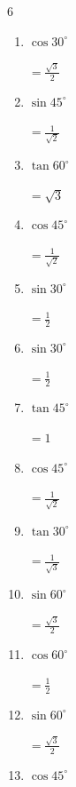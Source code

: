 \begin{multicols}{6}
\begin{enumerate}
        $\displaystyle =\frac{1}{\sqrt{2}}$

  \item $\displaystyle \cos{30^\circ}$

        $\displaystyle =\frac{\sqrt{3}}{2}$

  \item $\displaystyle \sin{45^\circ}$

        $\displaystyle =\frac{1}{\sqrt{2}}$

  \item $\displaystyle \tan{60^\circ}$

        $\displaystyle =\sqrt{3}$

  \item $\displaystyle \cos{45^\circ}$

        $\displaystyle =\frac{1}{\sqrt{2}}$

  \item $\displaystyle \sin{30^\circ}$

        $\displaystyle =\frac{1}{2}$

  \item $\displaystyle \sin{30^\circ}$

        $\displaystyle =\frac{1}{2}$

  \item $\displaystyle \tan{45^\circ}$

        $\displaystyle =1$

  \item $\displaystyle \cos{45^\circ}$

        $\displaystyle =\frac{1}{\sqrt{2}}$

  \item $\displaystyle \tan{30^\circ}$

        $\displaystyle =\frac{1}{\sqrt{3}}$

\columnbreak %

  \item $\displaystyle \sin{60^\circ}$

        $\displaystyle =\frac{\sqrt{3}}{2}$

  \item $\displaystyle \cos{60^\circ}$

        $\displaystyle =\frac{1}{2}$

  \item $\displaystyle \sin{60^\circ}$

        $\displaystyle =\frac{\sqrt{3}}{2}$

  \item $\displaystyle \cos{45^\circ}$


\end{enumerate}
\end{multicols}
